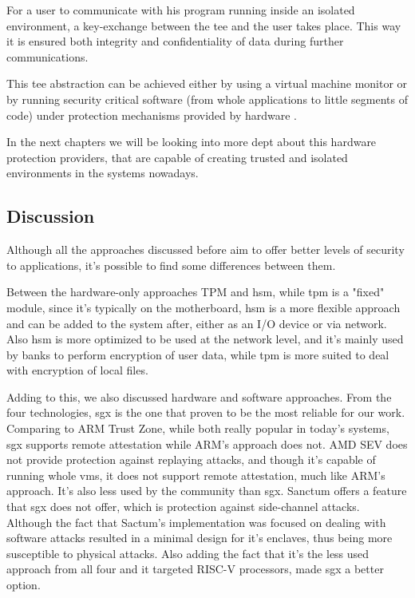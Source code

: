 For a user to communicate with his program running inside an isolated environment, a key-exchange between the \gls{tee} and the user takes place. This way it is ensured both integrity and confidentiality of data during further communications.

This \gls{tee} abstraction can be achieved either by using a virtual machine monitor or by running security critical software (from whole applications to little segments of code) under protection mechanisms provided by hardware \cite{pcopThesis}. 

In the next chapters we will be looking into more dept about this hardware protection providers, that are capable of creating trusted and isolated environments in the systems nowadays.




\subsection{Discussion}
\label{ssec:tee_discussion}

Although all the approaches discussed before aim to offer better levels of security to applications, it's possible to find some differences between them. 

Between the hardware-only approaches TPM and \gls{hsm}, while \gls{tpm} is a "fixed" module, since it's typically on the motherboard, \gls{hsm} is a more flexible approach and can be added to the system after, either as an I/O device or via network. Also \gls{hsm} is more optimized to be used at the network level, and it's mainly used by banks to perform encryption of user data, while \gls{tpm} is more suited to deal with encryption of local files.

Adding to this, we also discussed hardware and software approaches. 
From the four technologies, \gls{sgx} is the one that proven to be the most reliable for our work. Comparing to ARM Trust Zone, while both really popular in today's systems, \gls{sgx} supports remote attestation while ARM's approach does not. AMD SEV does not provide protection against replaying attacks, and though it's capable of running whole \gls{vm}s, it does not support remote attestation, much like ARM's approach. It's also less used by the community than \gls{sgx}. Sanctum offers a feature that \gls{sgx} does not offer, which is protection against side-channel attacks. Although the fact that Sactum's implementation was focused on dealing with software attacks resulted in a minimal design for it's enclaves, thus being more susceptible to physical attacks. Also adding the fact that it's the less used approach from all four and it targeted RISC-V processors, made \gls{sgx} a better option.

